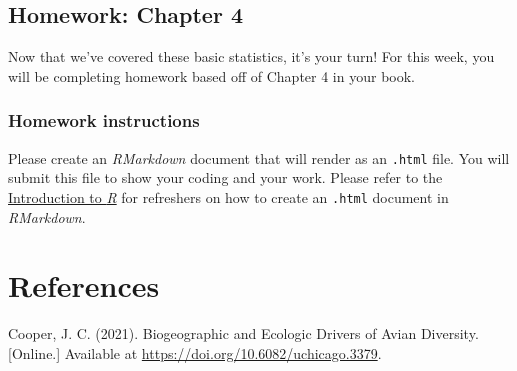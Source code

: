 \documentclass[
  letterpaper,
  DIV=11,
  numbers=noendperiod]{scrreprt}
\newlength{\cslhangindent}
\newenvironment{CSLReferences}[2] %
 {\begin{list}{}{%
  \setlength{\itemindent}{0pt}
  \setlength{\leftmargin}{0pt}
  \setlength{\parsep}{0pt}
  \ifodd #1
   \setlength{\leftmargin}{\cslhangindent}
   \setlength{\itemindent}{-1\cslhangindent}
  \fi
  \setlength{\itemsep}{#2\baselineskip}}}
 {\end{list}}
\begin{document}
\section{Homework: Chapter 4}\label{homework-chapter-4}

Now that we've covered these basic statistics, it's your turn! For this
week, you will be completing homework based off of Chapter 4 in your
book.

\subsection{Homework instructions}\label{homework-instructions}

Please create an \emph{RMarkdown} document that will render as an
\texttt{.html} file. You will submit this file to show your coding and
your work. Please refer to the
\href{https://jacobccooper.github.io/biol105_unk/intro_to_r.html}{Introduction
to \emph{R}} for refreshers on how to create an \texttt{.html} document
in \emph{RMarkdown}.


\chapter*{References}\label{references}


\label{refs}
\begin{CSLReferences}{1}{1}
Cooper, J. C. (2021). Biogeographic and {Ecologic} {Drivers} of {Avian}
{Diversity}. {[}Online.{]} Available at
\url{https://doi.org/10.6082/uchicago.3379}.

\end{CSLReferences}
\end{document}
